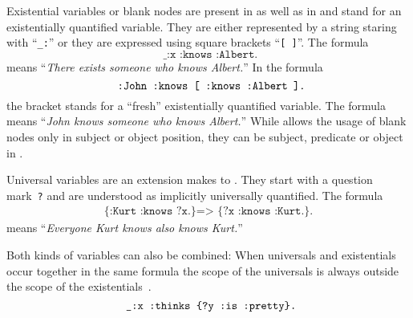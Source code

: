 Existential variables or blank nodes are present in \nthree as well as in \rdf  and stand for an existentially quantified variable. 
They are either represented by a string staring with ``\verb!_:!'' or they are expressed using square brackets ``\texttt{[~]}''. The formula
\begin{equation}
 \texttt{ \_:x :knows :Albert.}
\end{equation}
means ``\textit{There exists someone who knows Albert.}''
In the formula
\begin{equation}\label{fresh}
 \verb! :John :knows [ :knows :Albert ].!
\end{equation}
the bracket stands for a ``fresh'' existentially quantified variable. The formula means
``\textit{John knows someone who knows Albert.}''
While \rdf allows the usage of blank nodes only in subject or object position, they can be subject, predicate or object in \nthree.

Universal variables are an extension \nthree makes to \rdf. They start with a question mark~\verb!?! and are understood as implicitly universally quantified. The formula  
\begin{multline}\label{uni}
 \texttt{\{:Kurt :knows ?x.\} => }%
 \texttt{\{?x :knows :Kurt.\}.}%
\end{multline}
 means
``\textit{Everyone Kurt knows also knows Kurt.}''
% 

Both kinds of variables can also be combined:
When universals and existentials occur together in the same formula the scope of the universals is always outside the scope of the existentials~\cite{Notation3}.
\begin{equation}\label{both}
 \verb! _:x :thinks {?y :is :pretty}.!
\end{equation}


